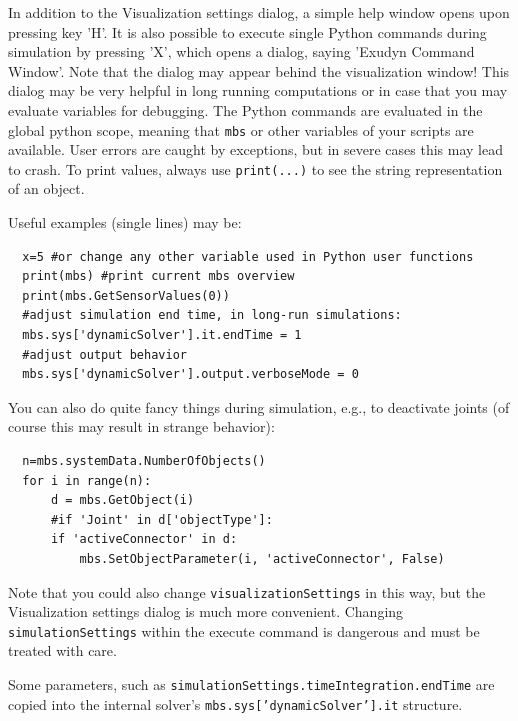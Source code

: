 %
In addition to the Visualization settings dialog, a simple help window opens upon pressing key 'H'. 
It is also possible to execute single Python commands during simulation by pressing 'X', which opens a dialog, saying 'Exudyn Command Window'. 
Note that the dialog may appear behind the visualization window!
This dialog may be very helpful in long running computations or in case that you may evaluate variables for debugging.
The Python commands are evaluated in the global python scope, meaning that \texttt{mbs} or other variables of your scripts are available.
User errors are caught by exceptions, but in severe cases this may lead to crash.
To print values, always use \texttt{print(...)} to see the string representation of an object.

\noindent Useful examples (single lines) may be: 
\pythonstyle\begin{lstlisting}
  x=5 #or change any other variable used in Python user functions
  print(mbs) #print current mbs overview
  print(mbs.GetSensorValues(0))
  #adjust simulation end time, in long-run simulations:
  mbs.sys['dynamicSolver'].it.endTime = 1 
  #adjust output behavior
  mbs.sys['dynamicSolver'].output.verboseMode = 0
\end{lstlisting}

\noindent You can also do quite fancy things during simulation, e.g., to deactivate joints (of course this may result in strange behavior):
\pythonstyle\begin{lstlisting}
  n=mbs.systemData.NumberOfObjects()
  for i in range(n):
      d = mbs.GetObject(i)
      #if 'Joint' in d['objectType']:
      if 'activeConnector' in d:
          mbs.SetObjectParameter(i, 'activeConnector', False)
\end{lstlisting}


Note that you could also change \texttt{visualizationSettings} in this way, but the Visualization settings dialog is much more convenient.
Changing \texttt{simulationSettings} within the execute command is dangerous and must be treated with care.

Some parameters, such as \texttt{simulationSettings.timeIntegration.endTime} are copied into the internal solver's \texttt{mbs.sys['dynamicSolver'].it} structure.

